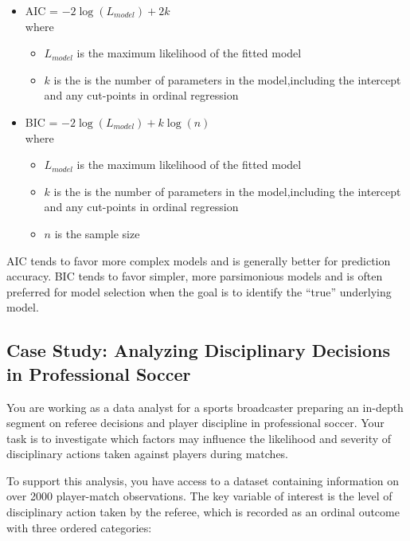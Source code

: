 \documentclass[
  letterpaper,
  DIV=11,
  numbers=noendperiod]{scrartcl}
\providecommand{\tightlist}{%
  \setlength{\itemsep}{0pt}\setlength{\parskip}{0pt}}\usepackage{longtable,booktabs,array}
\begin{document}
\begin{itemize}
\tightlist
\item
  AIC = \(-2 \log(L_{model})+2k\)\\
  where

  \begin{itemize}
  \tightlist
  \item
    \(L_{model}\) is the maximum likelihood of the fitted model
  \item
    \(k\) is the is the number of parameters in the model,including the
    intercept and any cut-points in ordinal regression
  \end{itemize}
\item
  BIC = \(-2 \log(L_{model})+k\log(n)\)\\
  where

  \begin{itemize}
  \tightlist
  \item
    \(L_{model}\) is the maximum likelihood of the fitted model
  \item
    \(k\) is the is the number of parameters in the model,including the
    intercept and any cut-points in ordinal regression
  \item
    \(n\) is the sample size
  \end{itemize}
\end{itemize}

AIC tends to favor more complex models and is generally better for
prediction accuracy. BIC tends to favor simpler, more parsimonious
models and is often preferred for model selection when the goal is to
identify the ``true'' underlying model.

\hypertarget{case-study-analyzing-disciplinary-decisions-in-professional-soccer}{%
\subsection{Case Study: Analyzing Disciplinary Decisions in Professional
Soccer}\label{case-study-analyzing-disciplinary-decisions-in-professional-soccer}}

You are working as a data analyst for a sports broadcaster preparing an
in-depth segment on referee decisions and player discipline in
professional soccer. Your task is to investigate which factors may
influence the likelihood and severity of disciplinary actions taken
against players during matches.

To support this analysis, you have access to a dataset containing
information on over 2000 player-match observations. The key variable of
interest is the level of disciplinary action taken by the referee, which
is recorded as an ordinal outcome with three ordered categories:
\end{document}
